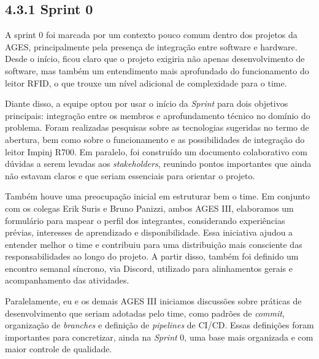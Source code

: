 \hypertarget{__RefHeading___Toc4815_3118176633}{}
\subsection*{4.3.1 Sprint 0}
\label{unit:ages-iii-sprint-0}
\indent \originaltab{}A sprint 0 foi marcada por um contexto pouco comum dentro dos projetos da AGES, principalmente pela presença de integração entre software e hardware. Desde o início, ficou claro que o projeto exigiria não apenas desenvolvimento de software, mas também um entendimento mais aprofundado do funcionamento do leitor RFID, o que trouxe um nível adicional de complexidade para o time.\par

\indent Diante disso, a equipe optou por usar o início da \textit{S}\textit{print} para dois objetivos principais: integração entre os membros e aprofundamento técnico no domínio do problema. Foram realizadas pesquisas sobre as tecnologias sugeridas no termo de abertura, bem como sobre o funcionamento e as possibilidades de integração do leitor Impinj R700. Em paralelo, foi construído um documento colaborativo com dúvidas a serem levadas aos \textit{stakeholders}, reunindo pontos importantes que ainda não estavam claros e que seriam essenciais para orientar o projeto.\par

\indent Também houve uma preocupação inicial em estruturar bem o time. Em conjunto com os colegas Erik Suris e Bruno Panizzi, ambos AGES III, elaboramos um formulário para mapear o perfil dos integrantes, considerando experiências prévias, interesses de aprendizado e disponibilidade. Essa iniciativa ajudou a entender melhor o time e contribuiu para uma distribuição mais consciente das responsabilidades ao longo do projeto. A partir disso, também foi definido um encontro semanal síncrono, via Discord, utilizado para alinhamentos gerais e acompanhamento das atividades.\par

\indent Paralelamente, eu e os demais AGES III iniciamos discussões sobre práticas de desenvolvimento que seriam adotadas pelo time, como padrões de \textit{commit}, organização de \textit{branches} e definição de \textit{pipelines} de CI/CD. Essas definições foram importantes para concretizar, ainda na \textit{Sprint} 0, uma base mais organizada e com maior controle de qualidade.\par

